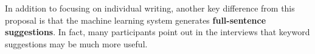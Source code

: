 
In addition to focusing on individual writing, another key difference from this proposal is that the machine learning system generates {\bf full-sentence suggestions}.
In fact, many participants point out in the interviews that keyword suggestions may be much more useful.

